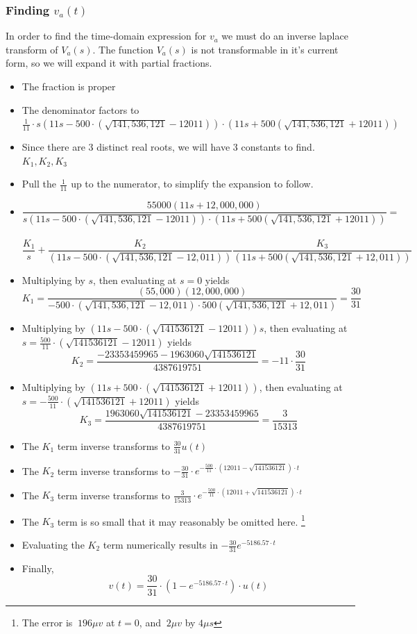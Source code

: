 \documentclass[11pt]{article}
\begin{document}
	\subsubsection*{Finding $v_a(t)$}
	In order to find the time-domain expression for $v_a$ we must do an inverse laplace transform of $V_a(s)$. The function $V_a(s)$ is not transformable in it's current form, so we will expand it with partial fractions.
	\begin{itemize}
		\item The fraction is proper
		\item The denominator factors to $\frac{1}{11}\cdot s(11s-500\cdot (\sqrt{141,536,121}-12011))\cdot (11s+500(\sqrt{141,536,121}+12011))$
		\item Since there are 3 distinct real roots, we will have 3 constants to find. $K_1,K_2,K_3$
		\item Pull the $\frac{1}{11}$ up to the numerator, to simplify the expansion to follow.
		\item \[ \frac{55000(11s+12,000,000)}{s(11s-500\cdot (\sqrt{141,536,121}-12011))\cdot (11s+500(\sqrt{141,536,121}+12011))} =\] \\ \[ \frac{K_1}{s} + \frac{K_2}{(11s-500\cdot (\sqrt{141,536,121}-12,011))} \frac{K_3}{(11s+500(\sqrt{141,536,121}+12,011))}\]
		
		\item Multiplying by $s$, then evaluating at $s=0$ yields \[K_1=\frac{(55,000)(12,000,000)}{-500\cdot (\sqrt{141,536,121}-12,011)\cdot 500(\sqrt{141,536,121}+12,011)} = \frac{30}{31}\]
		
		\item Multiplying by $(11s-500\cdot (\sqrt{141536121}-12011))s$, then evaluating at $s=\frac{500}{11}\cdot (\sqrt{141536121}-12011) $ yields \[K_2 = \frac{-23353459965-1963060 \sqrt{141536121}}{4387619751} = -11\cdot\frac{30}{31} \]
		
		\item Multiplying by $(11s+500\cdot (\sqrt{141536121}+12011))$, then evaluating at $s=-\frac{500}{11}\cdot (\sqrt{141536121}+12011)$ yields \[K_3 = \frac{1963060 \sqrt{141536121}-23353459965}{4387619751} = \frac{3}{15313}\]
		
		\item The $K_1$ term inverse transforms to $\frac{30}{31}u(t)$
		\item The $K_2$ term inverse transforms to $-\frac{30}{31}\cdot e^{-\frac{500}{11}\cdot (12011-\sqrt{141536121})\cdot t}$
		\item The $K_3$ term inverse transforms to $\frac{3}{15313}\cdot e^{-\frac{500}{11}\cdot (12011+\sqrt{141536121})\cdot t}$
		
		\item The $K_3$ term is so small that it may reasonably be omitted here. \footnote{The error is $~196\mu v$ at $t=0$, and $~2\mu v$ by $4\mu s$}
		\item Evaluating the $K_2$ term numerically results in $-\frac{30}{31}e^{-5186.57\cdot t}$
		\item Finally, \[ v(t) = \frac{30}{31}\cdot(1-e^{-5186.57\cdot t})\cdot u(t) \]
	\end{itemize}
	
\end{document}
